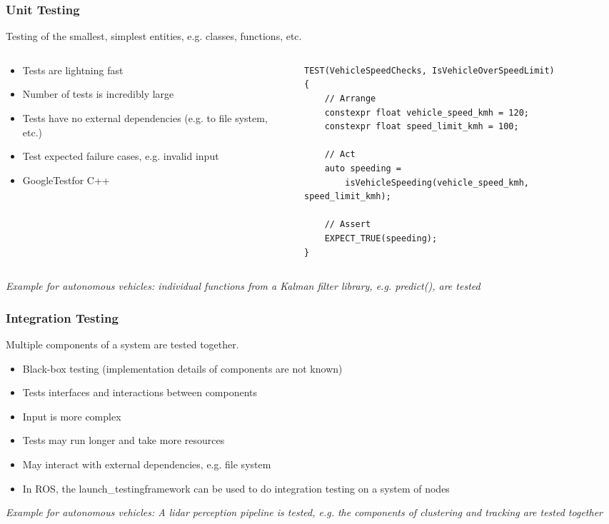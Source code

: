 \begin{frame}[fragile]
\frametitle{Unit Testing}
Testing of the smallest, simplest entities, e.g. classes, functions, etc.\\
\begin{columns}[]
    \begin{column}{0.5\textwidth}
        \begin{itemize}
            \item Tests are lightning fast
            \item Number of tests is incredibly large
            \item Tests have no external dependencies (e.g. to file system, etc.)
            \item Test expected failure cases, e.g. invalid input
            \item GoogleTest\footnotemark[1] for C++
        \end{itemize}
    \end{column}
    \begin{column}{0.5\textwidth}
\tiny
\begin{verbatim}
TEST(VehicleSpeedChecks, IsVehicleOverSpeedLimit)
{
    // Arrange
    constexpr float vehicle_speed_kmh = 120;
    constexpr float speed_limit_kmh = 100;

    // Act
    auto speeding =
        isVehicleSpeeding(vehicle_speed_kmh, speed_limit_kmh);

    // Assert
    EXPECT_TRUE(speeding);
}
\end{verbatim}
    \end{column}
\end{columns}
\vspace{0.25cm}
\emph{Example for autonomous vehicles: individual functions from a Kalman filter
library, e.g. predict(), are tested}
\end{frame}

\begin{frame}
\frametitle{Integration Testing}
Multiple components of a system are tested together.\\
\begin{itemize}
    \item Black-box testing (implementation details of components are not known)
    \item Tests interfaces and interactions between components
    \item Input is more complex
    \item Tests may run longer and take more resources
    \item May interact with external dependencies, e.g. file system
    \item In ROS, the launch\_testing\footnotemark[1] framework can be used to
        do integration testing on a system of nodes
\end{itemize}
\vspace{0.25cm}
\emph{Example for autonomous vehicles: A lidar perception pipeline is tested,
e.g. the components of clustering and tracking are tested together}
\end{frame}

